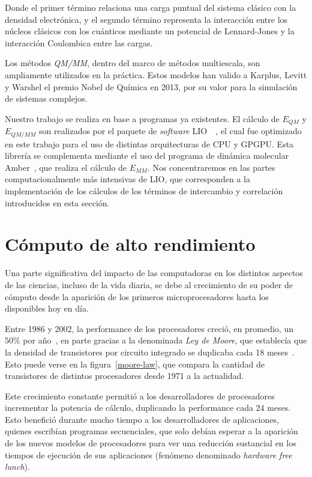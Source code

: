Donde el primer t\'ermino relaciona una carga puntual del sistema cl\'asico con la densidad
electr\'onica, y el segundo t\'ermino representa la interacci\'on entre los n\'ucleos cl\'asicos
con los cu\'anticos mediante un potencial de Lennard-Jones y la interacci\'on Coulombica entre
las cargas.

Los m\'etodos \textit{QM/MM}, dentro del marco de m\'etodos multiescala, son ampliamente utilizados en
la pr\'actica. Estos modelos han valido a Karplus, Levitt y
Warshel el premio Nobel de Qu\'imica en 2013, por su valor para la simulaci\'on de sistemas complejos.

Nuestro trabajo se realiza en base a programas ya existentes. El c\'alculo de $E_{QM}$ y $E_{QM/MM}$ son realizados por el paquete de
\textit{software} LIO~\cite{LIO}~\cite{TesisNitsche}, el cual fue optimizado en este trabajo para el uso de
distintas arquitecturas de CPU y GPGPU. Esta librer\'ia
se complementa mediante el uso del programa de din\'amica molecular Amber~\cite{Amber}, que realiza el c\'alculo
de $E_{MM}$. Nos concentraremos en las partes computacionalmente m\'as intensivas de LIO, que corresponden a la
implementaci\'on de los c\'alculos de los t\'erminos de intercambio y correlaci\'on introducidos en esta secci\'on.

\section{C\'omputo de alto rendimiento}

Una parte significativa del impacto de las computadoras en los distintos aspectos de las ciencias, incluso de la vida diaria, se debe al crecimiento de su poder de c\'omputo desde la aparici\'on de los primeros microprocesadores hasta los disponibles hoy en d\'ia.

Entre 1986 y 2002, la performance de los procesadores creci\'o, en promedio, un $50\%$ por a\~no~\cite{Pacheco}, en parte gracias a la denominada \textit{Ley de Moore}, que
establec\'ia que la densidad de transistores por circuito integrado se duplicaba cada 18 meses~\cite{HennessyPatterson}.
Esto puede verse en la figura~\ref{moore-law}, que compara la cantidad de transistores de distintos procesadores desde 1971 a la actualidad.

Este crecimiento constante permiti\'o a los desarrolladores de procesadores incrementar la potencia de c\'alculo, duplicando la performance cada 24 meses.
Esto benefici\'o durante mucho tiempo a los desarrolladores de aplicaciones, quienes escrib\'ian programas secuenciales, que solo deb\'ian esperar a la aparici\'on de los nuevos modelos de procesadores para ver una reducci\'on sustancial en los tiempos de ejecuci\'on de sus aplicaciones (fen\'omeno denominado \textit{hardware free lunch}).

